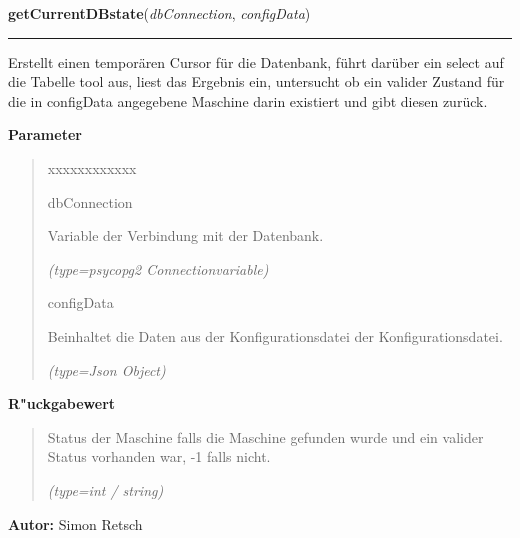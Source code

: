\hspace{.8\funcindent}\begin{boxedminipage}{\funcwidth}

    \raggedright \textbf{getCurrentDBstate}(\textit{dbConnection}, \textit{configData})

    \vspace{-1.5ex}

    \rule{\textwidth}{0.5\fboxrule}
\setlength{\parskip}{2ex}
    Erstellt einen temporären Cursor für die Datenbank, führt darüber ein 
    select auf die Tabelle tool aus, liest das Ergebnis ein, untersucht ob 
    ein valider Zustand für die in configData angegebene Maschine darin 
    existiert und gibt diesen zurück.

\setlength{\parskip}{1ex}
      \textbf{Parameter}
      \vspace{-1ex}

      \begin{quote}
        \begin{Ventry}{xxxxxxxxxxxx}

          \item[dbConnection]

          Variable der Verbindung mit der Datenbank.

            {\it (type=psycopg2 Connectionvariable)}

          \item[configData]

          Beinhaltet die Daten aus der Konfigurationsdatei der 
          Konfigurationsdatei.

            {\it (type=Json Object)}

        \end{Ventry}

      \end{quote}

      \textbf{R"uckgabewert}
    \vspace{-1ex}

      \begin{quote}
      Status der Maschine falls die Maschine gefunden wurde und ein valider
      Status vorhanden war, -1 falls nicht.

      {\it (type=int / string)}

      \end{quote}

\textbf{Autor:} Simon Retsch



    \end{boxedminipage}


